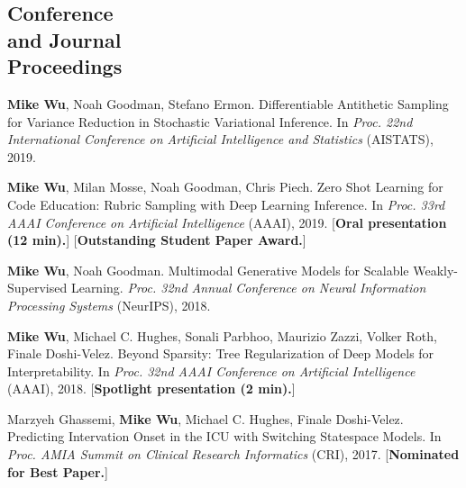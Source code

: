\documentclass[margin, 10pt]{res} %
\begin{document}
\begin{resume}



\section{Conference \\and Journal \\Proceedings}

\textbf{Mike Wu}, Noah Goodman, Stefano Ermon. Differentiable Antithetic Sampling for Variance Reduction in Stochastic Variational Inference. In \textit{Proc. 22nd International Conference on Artificial Intelligence and Statistics} (AISTATS), 2019.

\textbf{Mike Wu}, Milan Mosse, Noah Goodman, Chris Piech. Zero Shot Learning for Code Education: Rubric Sampling with Deep Learning Inference. In \textit{Proc. 33rd AAAI Conference on Artificial Intelligence} (AAAI), 2019. [\textbf{Oral presentation (12 min).}] [\textbf{Outstanding Student Paper Award.}]

\textbf{Mike Wu}, Noah Goodman. Multimodal Generative Models for Scalable Weakly-Supervised Learning. \textit{Proc. 32nd Annual Conference on Neural Information Processing Systems} (NeurIPS), 2018.

\textbf{Mike Wu}, Michael C. Hughes, Sonali Parbhoo, Maurizio Zazzi, Volker Roth, Finale Doshi-Velez. Beyond Sparsity: Tree Regularization of Deep Models for Interpretability. In \textit{Proc. 32nd AAAI Conference on Artificial Intelligence} (AAAI), 2018. [\textbf{Spotlight presentation (2 min).}]

Marzyeh Ghassemi, \textbf{Mike Wu}, Michael C. Hughes, Finale Doshi-Velez. Predicting Intervation Onset in the ICU with Switching Statespace Models. In \textit{Proc. AMIA Summit on Clinical Research Informatics} (CRI), 2017. [\textbf{Nominated for Best Paper.}]


\end{resume}
\end{document}
